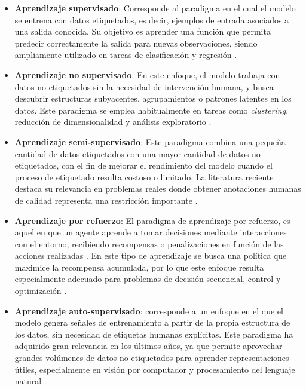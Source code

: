\begin{itemize}
    \item \textbf{Aprendizaje supervisado}: Corresponde al paradigma en el cual el modelo se entrena con datos etiquetados, es decir, ejemplos de entrada asociados a una salida conocida. Su objetivo es aprender una función que permita predecir correctamente la salida para nuevas observaciones, siendo ampliamente utilizado en tareas de clasificación y regresión \textcite{sarker2021machine}.
    \item \textbf{Aprendizaje no supervisado}: En este enfoque, el modelo trabaja con datos no etiquetados sin la necesidad de intervención humana, y busca descubrir estructuras subyacentes, agrupamientos o patrones latentes en los datos. Este paradigma se emplea habitualmente en tareas como \textit{clustering}, reducción de dimensionalidad y análisis exploratorio \textcite{sarker2021machine}.
    \item \textbf{Aprendizaje semi-supervisado}: Este paradigma combina una pequeña cantidad de datos etiquetados con una mayor cantidad de datos no etiquetados, con el fin de mejorar el rendimiento del modelo cuando el proceso de etiquetado resulta costoso o limitado. La literatura reciente destaca su relevancia en problemas reales donde obtener anotaciones humanas de calidad representa una restricción importante \textcite{9941371}.
    \item \textbf{Aprendizaje por refuerzo}: El paradigma de aprendizaje por refuerzo, es aquel en que un agente aprende a tomar decisiones mediante interacciones con el entorno, recibiendo recompensas o penalizaciones en función de las acciones realizadas \textcite{murphy2025reinforcementlearningoverview}. En este tipo de aprendizaje se busca una política que maximice la recompensa acumulada, por lo que este enfoque resulta especialmente adecuado para problemas de decisión secuencial, control y optimización \textcite{ghasemi2025comprehensivesurveyreinforcementlearning}. 
    \item \textbf{Aprendizaje auto-supervisado}: corresponde a un enfoque en el que el modelo genera señales de entrenamiento a partir de la propia estructura de los datos, sin necesidad de etiquetas humanas explícitas. Este paradigma ha adquirido gran relevancia en los últimos años, ya que permite aprovechar grandes volúmenes de datos no etiquetados para aprender representaciones útiles, especialmente en visión por computador y procesamiento del lenguaje natural \textcite{gui2024surveyselfsupervisedlearningalgorithms}.
    
\end{itemize}

